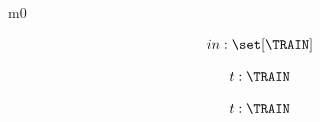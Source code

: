 \documentclass[12pt]{amsart}
\title{}
\author{}
\date{} %
\begin{document}
\maketitle
\tableofcontents


\begin{machine}{m0}


%
	\begin{align*}
\variable{		in : \set[\TRAIN]}
	\end{align*}
%




\begin{align*}
\dummy{	t : \TRAIN}
\end{align*}


\begin{align*}
\indices{leave}{	t: \TRAIN}
\end{align*}


\end{machine}
\end{document}
